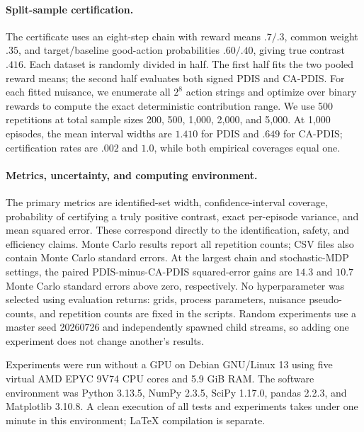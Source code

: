 \paragraph{Split-sample certification.}
The certificate uses an eight-step chain with reward means $.7/.3$, common weight $.35$, and target/baseline good-action probabilities $.60/.40$, giving true contrast $.416$. Each dataset is randomly divided in half. The first half fits the two pooled reward means; the second half evaluates both signed PDIS and CA-PDIS. For each fitted nuisance, we enumerate all $2^8$ action strings and optimize over binary rewards to compute the exact deterministic contribution range. We use 500 repetitions at total sample sizes 200, 500, 1,000, 2,000, and 5,000. At 1,000 episodes, the mean interval widths are $1.410$ for PDIS and $.649$ for CA-PDIS; certification rates are $.002$ and $1.0$, while both empirical coverages equal one.

\paragraph{Metrics, uncertainty, and computing environment.}
The primary metrics are identified-set width, confidence-interval coverage, probability of certifying a truly positive contrast, exact per-episode variance, and mean squared error. These correspond directly to the identification, safety, and efficiency claims. Monte Carlo results report all repetition counts; CSV files also contain Monte Carlo standard errors. At the largest chain and stochastic-MDP settings, the paired PDIS-minus-CA-PDIS squared-error gains are $14.3$ and $10.7$ Monte Carlo standard errors above zero, respectively. No hyperparameter was selected using evaluation returns: grids, process parameters, nuisance pseudo-counts, and repetition counts are fixed in the scripts. Random experiments use a master seed 20260726 and independently spawned child streams, so adding one experiment does not change another's results.

Experiments were run without a GPU on Debian GNU/Linux 13 using five virtual AMD EPYC 9V74 CPU cores and 5.9 GiB RAM. The software environment was Python 3.13.5, NumPy 2.3.5, SciPy 1.17.0, pandas 2.2.3, and Matplotlib 3.10.8. A clean execution of all tests and experiments takes under one minute in this environment; LaTeX compilation is separate.



